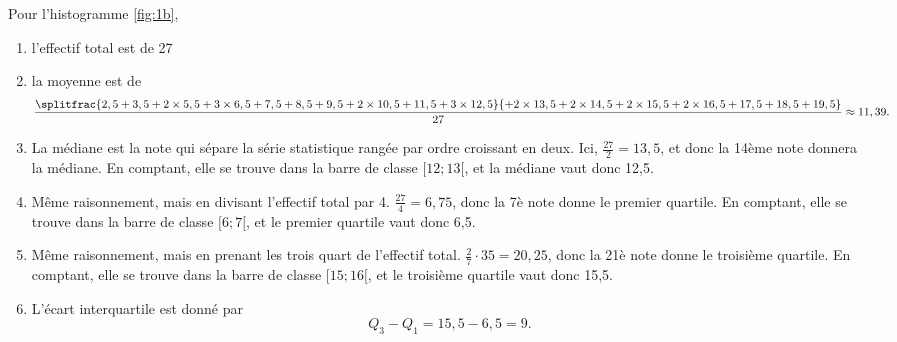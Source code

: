 {	
	
	Pour l'histogramme \ref{fig:1b},
	\begin{enumerate}[label=\roman*)]
		\item l'effectif total est de 27
		\item la moyenne est de 
			\[ \frac{
				\splitfrac{2,5+3,5+2\times5,5+3\times6,5+7,5+8,5+9,5+2\times10,5+11,5+3\times12,5}
				{+2\times13,5+2\times14,5+2\times15,5+2\times16,5 + 17,5+18,5+19,5}
				}{27} \approx 11,39. 
			\]
			
		\item 
		La médiane est la note qui sépare la série statistique rangée par ordre croissant en deux.
		Ici, $\frac{27}2 = 13,5$, et donc la 14ème note donnera la médiane.
		En comptant, elle se trouve dans la barre de classe $[12;13[$, et la médiane vaut donc 12,5.
		\item 
		Même raisonnement, mais en divisant l'effectif total par 4.
		$\frac{27}4 = 6,75$, donc la 7è note donne le premier quartile.
		En comptant, elle se trouve dans la barre de classe $[6;7[$, et le premier quartile vaut donc 6,5.
		\item 
		Même raisonnement, mais en prenant les trois quart de l'effectif total.
		$\frac27\cdot35 = 20,25$, donc la 21è note donne le troisième quartile.
		En comptant, elle se trouve dans la barre de classe $[15;16[$, et le troisième quartile vaut donc 15,5.
		\item 
		L'écart interquartile est donné par
			\[ Q_3 - Q_1 = 15,5 - 6,5 = 9. \]
	\end{enumerate}
}

